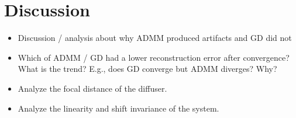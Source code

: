 \documentclass[final]{cvpr}
\begin{document}
\section{Discussion}

\begin{itemize}
	\item Discussion / analysis about why ADMM produced artifacts and GD
	      did not

	\item Which of ADMM / GD had a lower reconstruction error after
	      convergence?
	      What is the trend?
	      E.g., does GD converge but ADMM diverges?
	      Why?

	\item Analyze the focal distance of the diffuser.

	\item Analyze the linearity and shift invariance of the system.
\end{itemize}



\par\vfill\par

\clearpage
%
%
{\small
	
	
}

\clearpage
\end{document}
